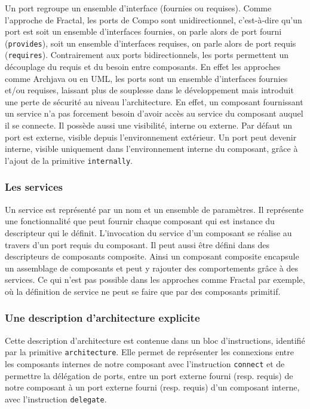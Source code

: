      Un port regroupe un ensemble d'interface (fournies ou requises). Comme l'approche de Fractal, les ports de Compo sont unidirectionnel, c'est-à-dire qu'un port est soit un ensemble d'interfaces fournies, on parle alors de port fourni (\texttt{provides}), soit un ensemble d'interfaces requises, on parle alors de port requis (\texttt{requires}). Contrairement aux ports bidirectionnels, les ports permettent un découplage du requis et du besoin entre composants. En effet les approches comme Archjava ou en UML, les ports sont un ensemble d'interfaces fournies et/ou requises, laissant plus de souplesse dans le développement mais introduit une perte de sécurité au niveau l'architecture. En effet, un composant fournissant un service n'a pas forcement besoin d'avoir accès au service du composant auquel il se connecte. Il possède aussi une visibilité, interne ou externe. Par défaut un port est externe, visible depuis l'environnement extérieur. Un port peut devenir interne, visible uniquement dans l'environnement interne du composant, grâce à l'ajout de la primitive \texttt{internally}.
    
    \subsubsection{Les services}
    
    Un service est représenté par un nom et un ensemble de paramètres. Il représente une fonctionnalité que peut fournir chaque composant qui est instance du descripteur qui le définit. L'invocation du service d'un composant se réalise au travers d'un port requis du composant. Il peut aussi être défini dans des descripteurs de composants composite. Ainsi un composant composite encapsule un assemblage de composants et peut y rajouter des comportements grâce à des services. Ce qui n'est pas possible dans les approches comme Fractal par exemple, où la définition de service ne peut se faire que par des composants primitif.
    
    \subsubsection{Une description d'architecture explicite}
      
      Cette description d'architecture est contenue dans un bloc d'instructions, identifié par la primitive \texttt{architecture}. Elle permet de représenter les connexions entre les composants internes de notre composant avec l’instruction \texttt{connect} et de permettre la délégation de ports, entre un port externe fourni (resp. requis) de notre composant à un port externe fourni (resp. requis) d'un composant interne, avec l'instruction \texttt{delegate}.
      
